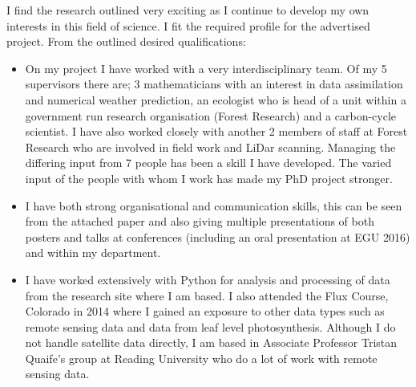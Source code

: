 \documentclass[11pt]{article}
\begin{document}
I find the research outlined very exciting as I continue to develop my own interests in this field of science. I fit the required profile for the advertised project. From the outlined desired qualifications:
\begin{itemize}
\item On my project I have worked with a very interdisciplinary team. Of my 5 supervisors there are; 3 mathematicians with an interest in data assimilation and numerical weather prediction, an ecologist who is head of a unit within a government run research organisation (Forest Research) and a carbon-cycle scientist. I have also worked closely with another 2 members of staff at Forest Research who are involved in field work and LiDar scanning. Managing the differing input from 7 people has been a skill I have developed. The varied input of the people with whom I work has made my PhD project stronger.
\item I have both strong organisational and communication skills, this can be seen from the attached paper and also giving multiple presentations of both posters and talks at conferences (including an oral presentation at EGU 2016) and within my department. 
\item I have worked extensively with Python for analysis and processing of data from the research site where I am based. I also attended the Flux Course, Colorado in 2014 where I gained an exposure to other data types such as remote sensing data and data from leaf level photosynthesis. Although I do not handle satellite data directly, I am based in Associate Professor Tristan Quaife's group at Reading University who do a lot of work with remote sensing data. 
\end{itemize}

\thispagestyle{empty}
{}
\end{document}
